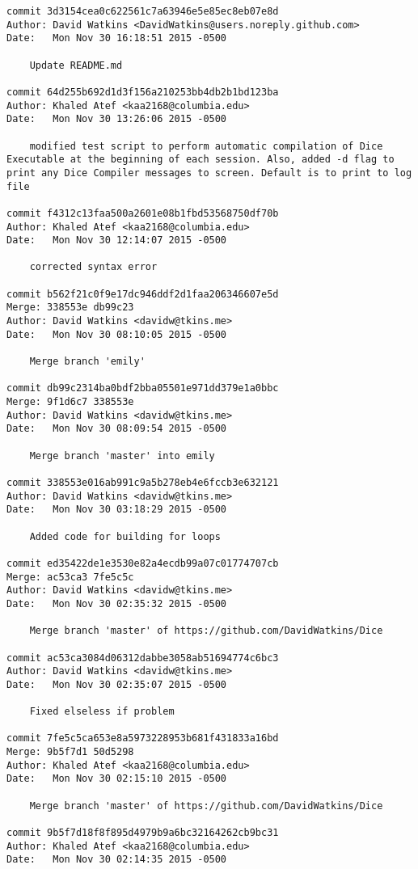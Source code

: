 \begin{verbatim}
commit 3d3154cea0c622561c7a63946e5e85ec8eb07e8d
Author: David Watkins <DavidWatkins@users.noreply.github.com>
Date:   Mon Nov 30 16:18:51 2015 -0500

    Update README.md

commit 64d255b692d1d3f156a210253bb4db2b1bd123ba
Author: Khaled Atef <kaa2168@columbia.edu>
Date:   Mon Nov 30 13:26:06 2015 -0500

    modified test script to perform automatic compilation of Dice Executable at the beginning of each session. Also, added -d flag to print any Dice Compiler messages to screen. Default is to print to log file

commit f4312c13faa500a2601e08b1fbd53568750df70b
Author: Khaled Atef <kaa2168@columbia.edu>
Date:   Mon Nov 30 12:14:07 2015 -0500

    corrected syntax error

commit b562f21c0f9e17dc946ddf2d1faa206346607e5d
Merge: 338553e db99c23
Author: David Watkins <davidw@tkins.me>
Date:   Mon Nov 30 08:10:05 2015 -0500

    Merge branch 'emily'

commit db99c2314ba0bdf2bba05501e971dd379e1a0bbc
Merge: 9f1d6c7 338553e
Author: David Watkins <davidw@tkins.me>
Date:   Mon Nov 30 08:09:54 2015 -0500

    Merge branch 'master' into emily

commit 338553e016ab991c9a5b278eb4e6fccb3e632121
Author: David Watkins <davidw@tkins.me>
Date:   Mon Nov 30 03:18:29 2015 -0500

    Added code for building for loops

commit ed35422de1e3530e82a4ecdb99a07c01774707cb
Merge: ac53ca3 7fe5c5c
Author: David Watkins <davidw@tkins.me>
Date:   Mon Nov 30 02:35:32 2015 -0500

    Merge branch 'master' of https://github.com/DavidWatkins/Dice

commit ac53ca3084d06312dabbe3058ab51694774c6bc3
Author: David Watkins <davidw@tkins.me>
Date:   Mon Nov 30 02:35:07 2015 -0500

    Fixed elseless if problem

commit 7fe5c5ca653e8a5973228953b681f431833a16bd
Merge: 9b5f7d1 50d5298
Author: Khaled Atef <kaa2168@columbia.edu>
Date:   Mon Nov 30 02:15:10 2015 -0500

    Merge branch 'master' of https://github.com/DavidWatkins/Dice

commit 9b5f7d18f8f895d4979b9a6bc32164262cb9bc31
Author: Khaled Atef <kaa2168@columbia.edu>
Date:   Mon Nov 30 02:14:35 2015 -0500


\end{verbatim}
